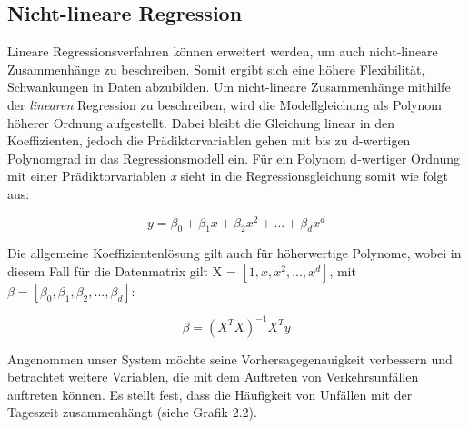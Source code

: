 \subsection{Nicht-lineare Regression}

Lineare Regressionsverfahren können erweitert werden, um auch nicht-lineare
Zusammenhänge zu beschreiben. Somit ergibt sich eine höhere Flexibilität,
Schwankungen in Daten abzubilden. Um nicht-lineare Zusammenhänge mithilfe der
\emph{linearen} Regression zu beschreiben, wird die Modellgleichung als Polynom
höherer Ordnung aufgestellt. Dabei bleibt die Gleichung linear in den Koeffizienten,
jedoch die Prädiktorvariablen gehen mit bis zu d-wertigen Polynomgrad in das
Regressionsmodell ein. Für ein Polynom d-wertiger Ordnung mit einer
Prädiktorvariablen \emph{x} sieht in die Regressionsgleichung somit wie folgt aus:

\begin{equation*}
y = \beta_0 + \beta_1 x + \beta_2 x^2 + ... + \beta_d x^d
\end{equation*}

Die allgemeine Koeffizientenlösung gilt auch für höherwertige Polynome, wobei in
diesem Fall für die Datenmatrix gilt X = $[1, x, x^2, ..., x^d]$, mit $\beta =
[\beta_0, \beta_1, \beta_2, ..., \beta_d]$:

\begin{equation*}
\beta = (X^TX)^{-1}X^Ty
\end{equation*}

Angenommen unser System möchte seine Vorhersagegenauigkeit verbessern und betrachtet
weitere Variablen, die mit dem Auftreten von Verkehrsunfällen auftreten können. Es
stellt fest, dass die Häufigkeit von Unfällen mit der Tageszeit zusammenhängt
(siehe Grafik 2.2).


